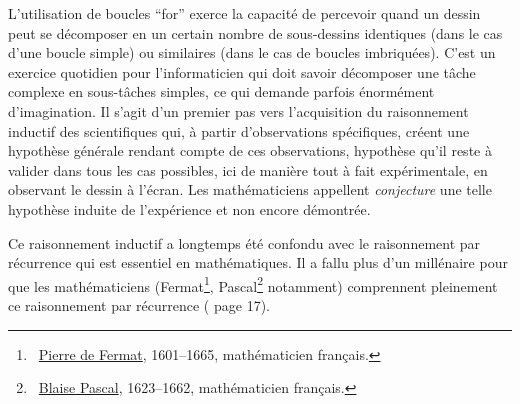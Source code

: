 {\begin{minipage}{\myparboxwidth}
L'utilisation de boucles ``for'' exerce la capacité de percevoir
quand un dessin peut se décomposer en un certain nombre de sous-dessins
identiques (dans le cas d'une boucle simple) ou similaires (dans le cas
de boucles imbriquées). C'est un exercice quotidien pour l'informaticien
qui doit savoir décomposer une tâche complexe en sous-tâches simples,
ce qui demande parfois énormément d'imagination.
Il s'agit d'un premier pas vers l'acquisition du raisonnement
inductif des scien\-ti\-fi\-ques qui, à partir d'observations spécifiques,
créent une hypothèse générale rendant compte de ces observations,
hypothèse qu'il reste à valider dans tous les cas possibles, ici de 
manière tout à fait expérimentale, en observant le dessin à 
l'écran. Les mathématiciens appellent {\em conjecture} une telle
hypothèse induite de l'expérience et non encore démontrée.

Ce raisonnement inductif a longtemps été confondu avec le raisonnement 
par récurrence qui est essentiel en mathématiques. Il a fallu plus d'un 
millénaire pour que les mathématiciens
(Fermat\footnote{\ \href{https://en.wikipedia.org/wiki/Pierre_de_Fermat}{Pierre de Fermat}, 1601--1665, mathématicien français.}, 
Pascal\footnote{\ \href{https://en.wikipedia.org/wiki/Blaise_Pascal}{Blaise Pascal}, 1623--1662, mathématicien français.}
notamment) comprennent
pleinement ce raisonnement par récurrence (\cite{knuth2} page 17).
\vspace{\abovedisplayskip}
\end{minipage}
}

